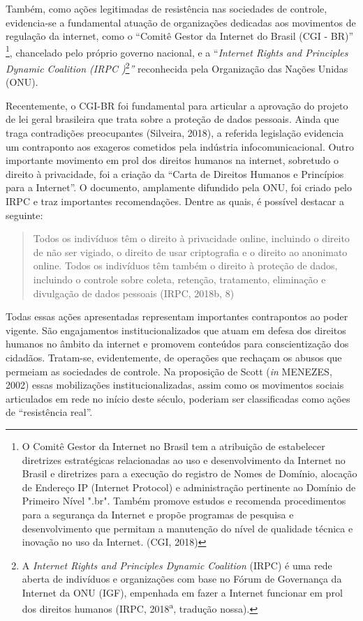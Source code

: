 Também, como ações legitimadas de resistência nas sociedades de
controle, evidencia-se a fundamental atuação de organizações dedicadas
aos movimentos de regulação da internet, como o ``Comitê Gestor da
Internet do Brasil (CGI - BR)'' \footnote{O Comitê Gestor da Internet no
  Brasil tem a atribuição de estabelecer diretrizes estratégicas
  relacionadas ao uso e desenvolvimento da Internet no Brasil e
  diretrizes para a execução do registro de Nomes de Domínio, alocação
  de Endereço IP (Internet Protocol) e administração pertinente ao
  Domínio de Primeiro Nível ".br". Também promove estudos e recomenda
  procedimentos para a segurança da Internet e propõe programas de
  pesquisa e desenvolvimento que permitam a manutenção do nível de
  qualidade técnica e inovação no uso da Internet. (CGI, 2018)},
chancelado pelo próprio governo nacional, e a ``\emph{Internet Rights
and Principles Dynamic Coalition (IRPC )}\footnote{A \emph{Internet
  Rights and Principles Dynamic Coalition} (IRPC) é uma rede aberta de
  indivíduos e organizações com base no Fórum de Governança da Internet
  da ONU (IGF), empenhada em fazer a Internet funcionar em prol dos
  direitos humanos (IRPC, 2018\textsuperscript{a}, tradução nossa).}\emph{''}
reconhecida pela Organização das Nações Unidas (ONU).

Recentemente, o CGI-BR foi fundamental para articular a aprovação do
projeto de lei geral brasileira que trata sobre a proteção de dados
pessoais. Ainda que traga contradições preocupantes (Silveira, 2018), a
referida legislação evidencia um contraponto aos exageros cometidos pela
indústria infocomunicacional. Outro importante movimento em prol dos
direitos humanos na internet, sobretudo o direito à privacidade, foi a
criação da ``Carta de Direitos Humanos e Princípios para a Internet''. O
documento, amplamente difundido pela ONU, foi criado pelo IRPC e traz
importantes recomendações. Dentre as quais, é possível destacar a
seguinte:

\begin{quote}
Todos os indivíduos têm o direito à privacidade online, incluindo o
direito de não ser vigiado, o direito de usar criptografia e o direito
ao anonimato online. Todos os indivíduos têm também o direito à proteção
de dados, incluindo o controle sobre coleta, retenção, tratamento,
eliminação e divulgação de dados pessoais (IRPC, 2018b, 8)
\end{quote}

Todas essas ações apresentadas representam importantes contrapontos ao
poder vigente. São engajamentos institucionalizados que atuam em defesa
dos direitos humanos no âmbito da internet e promovem conteúdos para
conscientização dos cidadãos. Tratam-se, evidentemente, de operações que
rechaçam os abusos que permeiam as sociedades de controle. Na proposição
de Scott (\emph{in} MENEZES, 2002) essas mobilizações
institucionalizadas, assim como os movimentos sociais articulados em
rede no início deste século, poderiam ser classificadas como ações de
``resistência real''.

